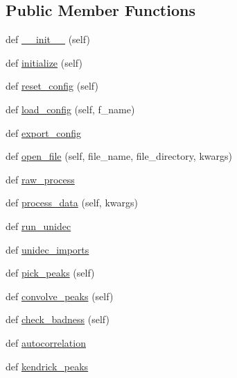 \subsection*{Public Member Functions}
\begin{DoxyCompactItemize}
\item 
def \hyperlink{class_uni_dec_1_1unidec_1_1_uni_dec_a4f9df0b60a83a61b2a7e807be4b43d88}{\+\_\+\+\_\+init\+\_\+\+\_\+} (self)
\item 
def \hyperlink{class_uni_dec_1_1unidec_1_1_uni_dec_adef21873bf21dacd292c058caf7eb41a}{initialize} (self)
\item 
def \hyperlink{class_uni_dec_1_1unidec_1_1_uni_dec_ad2c881aca7c830dcd8dd1cbebc966520}{reset\+\_\+config} (self)
\item 
def \hyperlink{class_uni_dec_1_1unidec_1_1_uni_dec_aa3afff3fd0380dfb761f8d39bbabbf39}{load\+\_\+config} (self, f\+\_\+name)
\item 
def \hyperlink{class_uni_dec_1_1unidec_1_1_uni_dec_a154034708376d04d9ba9e2bab7289bea}{export\+\_\+config}
\item 
def \hyperlink{class_uni_dec_1_1unidec_1_1_uni_dec_af0dedbe4b588b73e6e99a8bd35666cf7}{open\+\_\+file} (self, file\+\_\+name, file\+\_\+directory, kwargs)
\item 
def \hyperlink{class_uni_dec_1_1unidec_1_1_uni_dec_afb21e67b9873e5dc9f2261fb40a250ee}{raw\+\_\+process}
\item 
def \hyperlink{class_uni_dec_1_1unidec_1_1_uni_dec_a1e43dac7bb38b562281861c2cdb28e82}{process\+\_\+data} (self, kwargs)
\item 
def \hyperlink{class_uni_dec_1_1unidec_1_1_uni_dec_aff9d0eeef0d285c72fd5eb06e454df88}{run\+\_\+unidec}
\item 
def \hyperlink{class_uni_dec_1_1unidec_1_1_uni_dec_ab5af599dc89b9c3139505fc7f587befc}{unidec\+\_\+imports}
\item 
def \hyperlink{class_uni_dec_1_1unidec_1_1_uni_dec_a38de95c112bbce0d1fe6d2bce271c949}{pick\+\_\+peaks} (self)
\item 
def \hyperlink{class_uni_dec_1_1unidec_1_1_uni_dec_a339c753834564fc798fb74bf2b313c71}{convolve\+\_\+peaks} (self)
\item 
def \hyperlink{class_uni_dec_1_1unidec_1_1_uni_dec_a586e618101c3538ae5397a250e012e63}{check\+\_\+badness} (self)
\item 
def \hyperlink{class_uni_dec_1_1unidec_1_1_uni_dec_a96d9669620e211583231040caab21aac}{autocorrelation}
\item 
def \hyperlink{class_uni_dec_1_1unidec_1_1_uni_dec_a9afe6750bbaa886c8ed98abbda55a5de}{kendrick\+\_\+peaks}

\end{DoxyCompactItemize}
